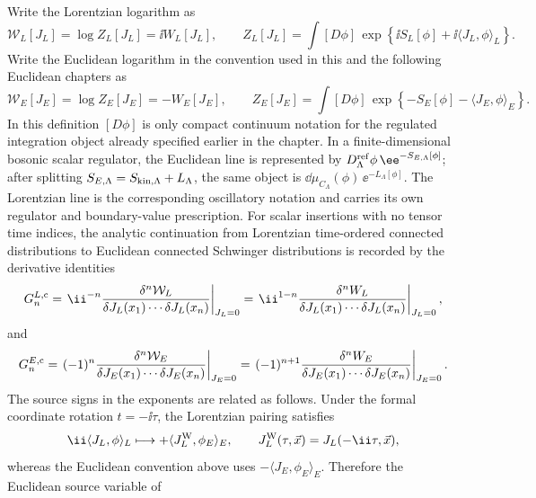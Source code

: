 \begin{definition}
\label{def:lorentzian-euclidean-source-bridge}
Write the Lorentzian logarithm as
\[
  \mathcal W_L[J_L]=\log Z_L[J_L]=\ii W_L[J_L],
  \qquad
  Z_L[J_L]
  =
  \int[D\phi]\,\exp\!\left\{\ii S_L[\phi]
  +\ii\langle J_L,\phi\rangle_L\right\}.
\]
Write the Euclidean logarithm in the convention used in this and the following
Euclidean chapters as
\[
  \mathcal W_E[J_E]=\log Z_E[J_E]=-W_E[J_E],
  \qquad
  Z_E[J_E]
  =
  \int[D\phi]\,\exp\!\left\{-S_E[\phi]-\langle J_E,\phi\rangle_E\right\}.
\]
In this definition \([D\phi]\) is only compact continuum notation for the
regulated integration object already specified earlier in the chapter.  In a
finite-dimensional bosonic scalar regulator, the Euclidean line is represented
by \(D_\Lambda^{\rm ref}\phi\,\ee^{-S_{E,\Lambda}[\phi]}\); after splitting
\(S_{E,\Lambda}=S_{\rm kin,\Lambda}+L_\Lambda\), the same object is
\(\dd\mu_{C_\Lambda}(\phi)\,\ee^{-L_\Lambda[\phi]}\).  The Lorentzian line is
the corresponding oscillatory notation and carries its own regulator and
boundary-value prescription.
For scalar insertions with no tensor time indices, the analytic continuation
from Lorentzian time-ordered connected distributions to Euclidean connected
Schwinger distributions is recorded by the derivative identities
\begin{equation}
  G^{L,{\rm c}}_n
  =
  \left.
  \ii^{-n}
  \frac{\delta^n\mathcal W_L}
       {\delta J_L(x_1)\cdots\delta J_L(x_n)}
  \right|_{J_L=0}
  =
  \left.
  \ii^{1-n}
  \frac{\delta^n W_L}
       {\delta J_L(x_1)\cdots\delta J_L(x_n)}
  \right|_{J_L=0},
  \label{eq:lorentzian-connected-derivative-normalization}
\end{equation}
and
\begin{equation}
  G^{E,{\rm c}}_n
  =
  \left.
  (-1)^n
  \frac{\delta^n\mathcal W_E}
       {\delta J_E(x_1)\cdots\delta J_E(x_n)}
  \right|_{J_E=0}
  =
  \left.
  (-1)^{n+1}
  \frac{\delta^n W_E}
       {\delta J_E(x_1)\cdots\delta J_E(x_n)}
  \right|_{J_E=0}.
  \label{eq:euclidean-connected-derivative-normalization}
\end{equation}
The source signs in the exponents are related as follows.  Under the formal
coordinate rotation \(t=-\ii\tau\), the Lorentzian pairing satisfies
\[
  \ii\langle J_L,\phi\rangle_L
  \longmapsto
  +\langle J_L^{\rm W},\phi_E\rangle_E,
  \qquad
  J_L^{\rm W}(\tau,\vec x)=J_L(-\ii\tau,\vec x),
\]
whereas the Euclidean convention above uses
\(-\langle J_E,\phi_E\rangle_E\).  Therefore the Euclidean source variable of

\end{definition}
